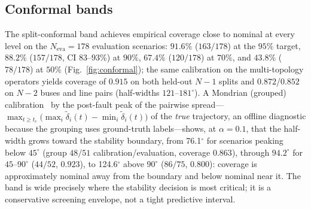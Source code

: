 \documentclass[5p,times]{elsarticle}
\newcommand{\mondA}{76.1}             %
\newcommand{\mondC}{124.6}            %
\begin{document}
\subsection{Conformal bands}
The split-conformal band achieves empirical coverage close to nominal at every level on the
$N_{\mathrm{eva}}{=}178$ evaluation scenarios: $91.6\%$ ($163/178$) at the $95\%$ target,
$88.2\%$ ($157/178$, CI $83$--$93\%$) at $90\%$, $67.4\%$ ($120/178$) at $70\%$, and $43.8\%$
($78/178$) at $50\%$ (Fig.~\ref{fig:conformal}); the same calibration on the multi-topology
operators yields coverage of $0.915$ on both held-out $N{-}1$ splits and $0.872$/$0.852$ on
$N{-}2$ buses and line pairs (half-widths $121$--$181^\circ$). A Mondrian (grouped)
calibration~\cite{vovk2005algorithmic} by the post-fault peak of the pairwise
spread---$\max_{t\ge t_c}\bigl(\max_i \tilde\delta_i(t)-\min_i \tilde\delta_i(t)\bigr)$ of the
\emph{true} trajectory, an offline diagnostic because the grouping uses ground-truth labels---shows,
at $\alpha{=}0.1$, that the half-width grows toward the stability boundary, from
\mondA{}$^\circ$ for scenarios peaking below $45^\circ$ (group $48/51$ calibration/evaluation,
coverage $0.863$), through $94.2^\circ$ for $45$--$90^\circ$ ($44/52$, $0.923$), to
\mondC{}$^\circ$ above $90^\circ$ ($86/75$, $0.800$): coverage is approximately nominal away from
the boundary and below nominal near it. The band is wide precisely where the stability decision
is most critical; it is a conservative screening envelope, not a tight predictive interval.
\end{document}
